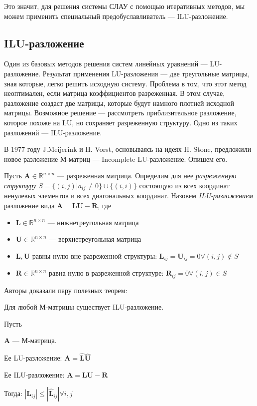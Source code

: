 \documentclass[14pt, a4paper]{extreport}
\begin{document}
Это значит, для решения системы СЛАУ с помощью итеративных методов, мы можем применить специальный предобуславливатель --- ILU-разложение. 

\clearpage


\subsection{ILU-разложение}
Один из базовых методов решения систем линейных уравнений --- LU-разложение. Результат применения LU-разложения --- две треугольные матрицы, зная которые, легко решить исходную систему. Проблема в том, что этот метод неоптимален, если матрица коэффициентов разреженная. В этом случае, разложение создаст две матрицы, которые будут намного плотней исходной матрицы. Возможное решение --- рассмотреть приблизительное разложение, которое похоже на LU, но сохраняет разреженную структуру. Одно из таких разложений --- ILU-разложение.

В 1977 году J.Meijerink и H. Vorst, основываясь на идеях H. Stone\cite{proto_ilu}, предложили новое разложение М-матриц --- Incomplete LU-разложение\cite{ilu}. Опишем его.

Пусть $\mathbf{A} \in \mathbb{R}^{n \times n}$ --- разреженная матрица. Определим для нее \emph{разреженную структуру} $S = \{(i, j) | a_{ij} \neq 0\} \cup \{(i,i)\}$ состоящую из всех координат ненулевых элементов и всех диагональных координат. Назовем \emph{ILU-разложением} разложение вида $\mathbf{A} = \mathbf{L}\mathbf{U} - \mathbf{R}$, где
\begin{itemize}
	\item $\mathbf{L} \in \mathbb{R}^{n \times n}$ --- нижнетреугольная матрица
	\item $\mathbf{U} \in \mathbb{R}^{n \times n}$ --- верхнетреугольная матрица
	\item $\mathbf{L}, \mathbf{U}$ равны нулю вне разреженной структуры: $\mathbf{L}_{ij} = \mathbf{U}_{ij} = 0 \forall (i, j) \notin S$
	\item $\mathbf{R} \in \mathbb{R}^{n \times n}$ равна нулю в разреженной структуре: $\mathbf{R}_{ij} = 0 \forall (i, j) \in S$
\end{itemize}

Авторы доказали пару полезных теорем:
\begin{theorem}[Существование]
	Для любой М-матрицы существует ILU-разложение.
\end{theorem}
\begin{theorem}[Устойчивость]
	Пусть 
	
	$\mathbf{A}$ --- М-матрица. 
	
	Ее LU-разложение: $\mathbf{A} = \hat{\mathbf{L}}\hat{\mathbf{U}}$ 
	
	Ее ILU-разложение: $\mathbf{A} = \mathbf{LU} - \mathbf{R}$
	
	Тогда: $|\mathbf{L}_{ij}| \leq |\hat{\mathbf{L}}_{ij}| \forall i,j$
\end{theorem}
\end{document}
